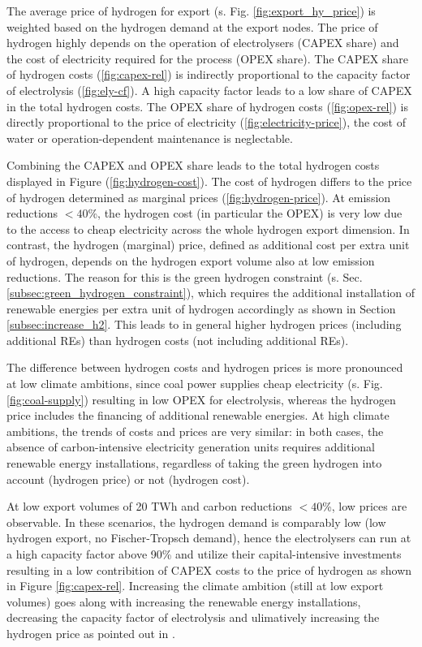 The average price of hydrogen for export (s. Fig. \ref{fig:export_hy_price}) is weighted based on the hydrogen demand at the export nodes. 
The price of hydrogen highly depends on the operation of electrolysers (CAPEX share) and the cost of electricity required for the process (OPEX share). The CAPEX share of hydrogen costs (\ref{fig:capex-rel}) is indirectly proportional to the capacity factor of electrolysis (\ref{fig:ely-cf}). A high capacity factor leads to a low share of CAPEX in the total hydrogen costs. The OPEX share of hydrogen costs (\ref{fig:opex-rel}) is directly proportional to the price of electricity (\ref{fig:electricity-price}), the cost of water or operation-dependent maintenance is neglectable. %

Combining the CAPEX and OPEX share leads to the total hydrogen costs displayed in Figure (\ref{fig:hydrogen-cost}). The cost of hydrogen differs to the price of hydrogen determined as marginal prices (\ref{fig:hydrogen-price}). At emission reductions $<40$\%, the hydrogen cost (in particular the OPEX) is very low due to the access to cheap electricity across the whole hydrogen export dimension. In contrast, the hydrogen (marginal) price, defined as additional cost per extra unit of hydrogen, depends on the hydrogen export volume also at low emission reductions. The reason for this is the green hydrogen constraint (s. Sec. \ref{subsec:green_hydrogen_constraint}), which requires the additional installation of renewable energies per extra unit of hydrogen accordingly as shown in Section \ref{subsec:increase_h2}. This leads to in general higher hydrogen prices (including additional REs) than hydrogen costs (not including additional REs). 

The difference between hydrogen costs and hydrogen prices is more pronounced at low climate ambitions, since coal power supplies cheap electricity (s. Fig. \ref{fig:coal-supply}) resulting in low OPEX for electrolysis, whereas the hydrogen price includes the financing of additional renewable energies. At high climate ambitions, the trends of costs and prices are very similar: in both cases, the absence of carbon-intensive electricity generation units requires additional renewable energy installations, regardless of taking the green hydrogen into account (hydrogen price) or not (hydrogen cost).

At low export volumes of 20 TWh and carbon reductions $<40$\%, low prices are observable. In these scenarios, the hydrogen demand is comparably low (low hydrogen export, no Fischer-Tropsch demand), hence the electrolysers can run at a high capacity factor above 90\% and utilize their capital-intensive investments resulting in a low contribition of CAPEX costs to the price of hydrogen as shown in Figure \ref{fig:capex-rel}. Increasing the climate ambition (still at low export volumes) goes along with increasing the renewable energy installations, decreasing the capacity factor of electrolysis and ulimatively increasing the hydrogen price as pointed out in \cite{Ruggles2021}.

